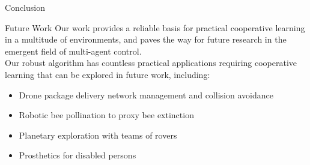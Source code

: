 \documentclass[final]{beamer}
\newlength{\onecolwid}
\begin{document}
\begin{frame}[t]
\begin{columns}[t]
\begin{column}{\onecolwid}
\begin{block}{Conclusion}
\end{block}


\begin{block}{Future Work}
Our work provides a reliable basis for practical cooperative learning in a multitude of environments, and paves the way for future research in the emergent field of multi-agent control.
\\[12pt]
Our robust algorithm has countless practical applications requiring cooperative learning that can be explored in future work, including:

\begin{itemize}
\item Drone package delivery network management and collision avoidance
\item Robotic bee pollination to proxy bee extinction
\item Planetary exploration with teams of rovers
\item Prosthetics for disabled persons
\end{itemize}

\end{block}










\end{column} %

\end{columns} %

\end{frame} %
\end{document}
